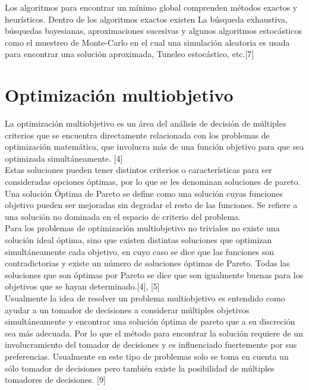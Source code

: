 Los algoritmos para encontrar un mínimo global comprenden métodos exactos y heurísticos. Dentro de los algoritmos exactos existen La búsqueda exhaustiva, búsquedas bayesianas, aproximaciones sucesivas y algunos algoritmos estocásticos como el muestreo de Monte-Carlo en el cual una simulación aleatoria es usada para encontrar una solución aproximada, Tuneleo estocástico, etc.[7] \\

\section{Optimización multiobjetivo}

La optimización multiobjetivo es un área del análisis de decisión de múltiples criterios que se encuentra directamente relacionada con los problemas de optimización matemática, que involucra más de una función objetivo para que sea optimizada simultáneamente. [4] \\

Estas soluciones pueden tener distintos criterios o características para ser consideradas opciones óptimas, por lo que se les denominan soluciones de pareto. Una solución Óptima de Pareto se define como una solución cuyas funciones objetivo pueden ser mejoradas sin degradar el resto de las funciones. Se refiere a una solución no dominada en el espacio de criterio del problema. \\

Para los problemas de optimización multiobjetivo no triviales no existe una solución ideal óptima, sino que existen distintas soluciones que optimizan simultáneamente cada objetivo, en cuyo caso se dice que las funciones son contradictorias y existe un número de soluciones óptimas de Pareto. Todas las soluciones que son óptimas por Pareto se dice que son igualmente buenas para los objetivos que se hayan determinado.[4], [5] \\

Usualmente la idea de resolver un problema multiobjetivo es entendido como ayudar a un tomador de decisiones a considerar múltiples objetivos simultáneamente y encontrar una solución óptima de pareto que a su discreción sea más adecuada. Por lo que el método para encontrar la solución requiere de un involucramiento del tomador de decisiones y es influenciado fuertemente por sus preferencias. Usualmente en este tipo de problemas solo se toma en cuenta un sólo tomador de decisiones pero también existe la posibilidad de múltiples tomadores de decisiones. [9]

